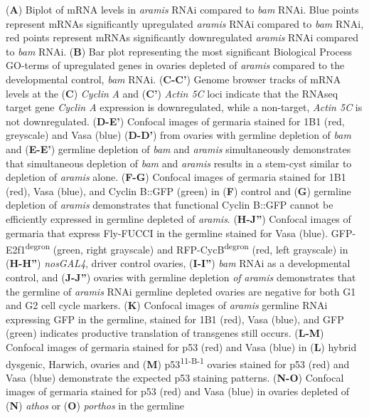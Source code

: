 \documentclass[12pt,oneside]{reedthesis}
\begin{document}
(\textbf{A}) Biplot of
mRNA levels in \emph{aramis} RNAi compared to \emph{bam} RNAi. Blue points
represent mRNAs significantly upregulated \emph{aramis} RNAi compared to
\emph{bam} RNAi, red points represent mRNAs significantly downregulated
\emph{aramis} RNAi compared to \emph{bam} RNAi. (\textbf{B}) Bar plot representing the
most significant Biological Process GO-terms of upregulated genes in
ovaries depleted of \emph{aramis} compared to the developmental control,
\emph{bam} RNAi. (\textbf{C-C'}) Genome browser tracks of mRNA levels at the
(\textbf{C}) \emph{Cyclin} \emph{A} and (\textbf{C'}) \emph{Actin 5C} loci indicate that the
RNAseq target gene \emph{Cyclin A} expression is downregulated, while a
non-target, \emph{Actin 5C} is not downregulated. (\textbf{D-E'}) Confocal images
of germaria stained for 1B1 (red, greyscale) and Vasa (blue) (\textbf{D-D'})
from ovaries with germline depletion of \emph{bam} and (\textbf{E-E'}) germline
depletion of \emph{bam} and \emph{aramis} simultaneously demonstrates that
simultaneous depletion of \emph{bam} and \emph{aramis} results in a stem-cyst
similar to depletion of \emph{aramis} alone. (\textbf{F-G}) Confocal images of
germaria stained for 1B1 (red), Vasa (blue), and Cyclin B::GFP (green)
in (\textbf{F}) control and (\textbf{G}) germline depletion of \emph{aramis}
demonstrates that functional Cyclin B::GFP cannot be efficiently
expressed in germline depleted of \emph{aramis}. (\textbf{H-J''}) Confocal images
of germaria that express Fly-FUCCI in the germline stained for Vasa
(blue). GFP-E2f1\textsuperscript{degron} (green, right grayscale) and RFP-CycB\textsuperscript{degron}
(red, left grayscale) in (\textbf{H-H''}) \emph{nosGAL4}, driver control ovaries,
(\textbf{I-I''}) \emph{bam} RNAi as a developmental control, and (\textbf{J-J''})
ovaries with germline depletion \emph{of} \emph{aramis} demonstrates that the
germline of \emph{aramis} RNAi germline depleted ovaries are negative for
both G1 and G2 cell cycle markers. (\textbf{K}) Confocal images of \emph{aramis}
germline RNAi expressing GFP in the germline, stained for 1B1 (red),
Vasa (blue), and GFP (green) indicates productive translation of
transgenes still occurs. (\textbf{L-M}) Confocal images of germaria stained
for p53 (red) and Vasa (blue) in (\textbf{L}) hybrid dysgenic, Harwich,
ovaries and (\textbf{M}) p53\textsuperscript{11-B-1} ovaries stained for p53 (red) and Vasa
(blue) demonstrate the expected p53 staining patterns. (\textbf{N-O})
Confocal images of germaria stained for p53 (red) and Vasa (blue) in
ovaries depleted of (\textbf{N}) \emph{athos} or (\textbf{O}) \emph{porthos} in the germline
\end{document}
